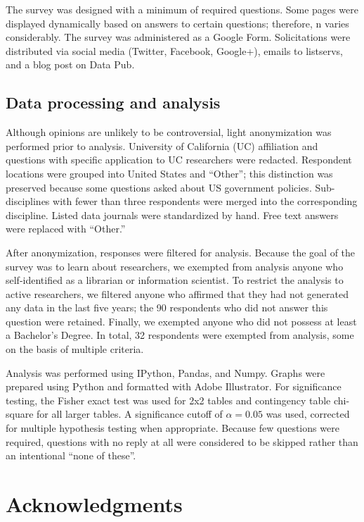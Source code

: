 \documentclass[10pt]{article}
\begin{document}
The survey was designed with a minimum of required questions.
Some pages were displayed dynamically based on answers to certain questions; therefore, n varies considerably.
The survey was administered as a Google Form.
Solicitations were distributed via social media (Twitter, Facebook, Google+), emails to listservs, and a blog post on Data Pub\cite{kratz_data_2014}.

\subsection*{Data processing and analysis}
Although opinions are unlikely to be controversial, light anonymization was performed prior to analysis.
University of California (UC) affiliation and questions with specific application to UC researchers were redacted.
Respondent locations were grouped into United States and ``Other''; this distinction was preserved because some questions asked about US government policies.  
Sub-disciplines with fewer than three respondents were merged into the corresponding discipline.
Listed data journals were standardized by hand.
Free text answers were replaced with ``Other.''

After anonymization, responses were filtered for analysis.
Because the goal of the survey was to learn about researchers, we exempted from analysis anyone who self-identified as a librarian or information scientist.
To restrict the analysis to active researchers, we filtered anyone who affirmed that they had not generated any data in the last five years; the 90 respondents who did not answer this question were retained.
Finally, we exempted anyone who did not possess at least a Bachelor's Degree.
In total, 32 respondents were exempted from analysis, some on the basis of multiple criteria.

Analysis was performed using IPython\cite{perez_ipython_2007}, Pandas\cite{mckinney-proc-scipy-2010}, and Numpy\cite{van_der_walt_numpy_2011}.
Graphs were prepared using Python and formatted with Adobe Illustrator.
For significance testing, the Fisher exact test was used for 2x2 tables and contingency table chi-square for all larger tables.
A significance cutoff of $\alpha=0.05$ was used, corrected for multiple hypothesis testing when appropriate.
Because few questions were required, questions with no reply at all were considered to be skipped rather than an intentional ``none of these''.


\section*{Acknowledgments}
\end{document}
